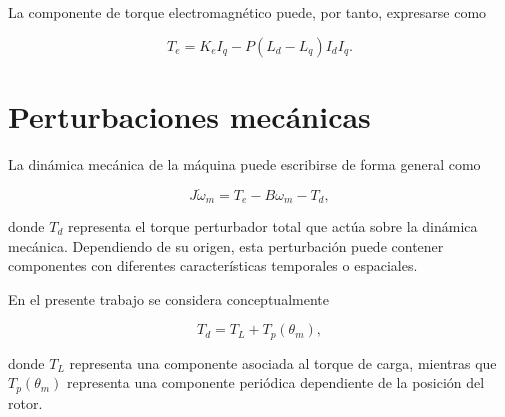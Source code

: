 La componente de torque electromagnético puede, por tanto, expresarse como

\begin{equation}
\label{eq:torque_electromagnetico}
T_e =
K_eI_q
-
P(L_d-L_q)I_dI_q.
\end{equation}

%
%



\section{Perturbaciones mecánicas}

%

La dinámica mecánica de la máquina puede escribirse de forma general como

\begin{equation}
\label{eq:dinamica_mecanica_general}
J\dot{\omega}_m
=
T_e
-
B\omega_m
-
T_d,
\end{equation}

donde $T_d$ representa el torque perturbador total que actúa sobre la 
dinámica mecánica. Dependiendo de su origen, esta perturbación puede contener 
componentes con diferentes características temporales o espaciales.

En el presente trabajo se considera conceptualmente

\begin{equation}
\label{eq:perturbacion_total}
T_d =
T_L + T_p(\theta_m),
\end{equation}

donde $T_L$ representa una componente asociada al torque de carga, mientras 
que $T_p(\theta_m)$ representa una componente periódica dependiente de la 
posición del rotor.


